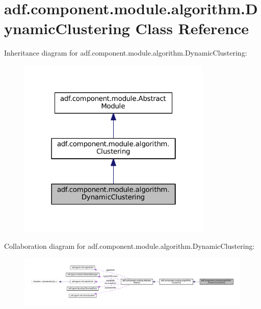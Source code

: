 \hypertarget{classadf_1_1component_1_1module_1_1algorithm_1_1DynamicClustering}{}\section{adf.\+component.\+module.\+algorithm.\+Dynamic\+Clustering Class Reference}
\label{classadf_1_1component_1_1module_1_1algorithm_1_1DynamicClustering}


Inheritance diagram for adf.\+component.\+module.\+algorithm.\+Dynamic\+Clustering\+:
\nopagebreak
\begin{figure}[H]
\begin{center}
\leavevmode
\includegraphics[width=262pt]{classadf_1_1component_1_1module_1_1algorithm_1_1DynamicClustering__inherit__graph}
\end{center}
\end{figure}


Collaboration diagram for adf.\+component.\+module.\+algorithm.\+Dynamic\+Clustering\+:
\nopagebreak
\begin{figure}[H]
\begin{center}
\leavevmode
\includegraphics[width=350pt]{classadf_1_1component_1_1module_1_1algorithm_1_1DynamicClustering__coll__graph}
\end{center}
\end{figure}
